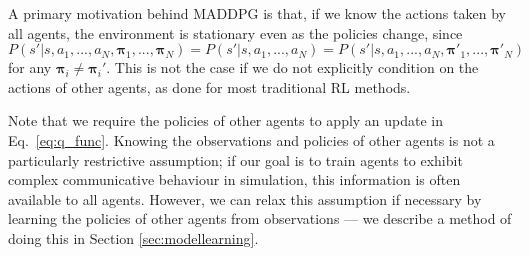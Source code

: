 \documentclass{article}
\newcommand{\pol}[0]{\pmb{\pi}}
\begin{document}
A primary motivation behind MADDPG is that, if we know the actions taken by all agents, the environment is stationary even as the policies change, since $P(s'|s,a_1,...,a_N,\pol_1,...,\pol_N) = P(s'|s,a_1,...,a_N) = P(s'|s,a_1,...,a_N,\pol'_1,...,\pol'_N)$ for any $\pol_i \neq \pol_i'$. This is not the case if we do not explicitly condition on the actions of other agents, as done for most traditional RL methods. %

Note that we require the policies of other agents to apply an update in Eq.~\ref{eq:q_func}. Knowing the observations and policies of other agents is not a particularly restrictive assumption; if our goal is to train agents to exhibit complex communicative behaviour in simulation, this information is often available to all agents.
However, we can relax this assumption if necessary by learning the policies of other agents from observations --- we describe a method of doing this in Section \ref{sec:modellearning}.
\end{document}
